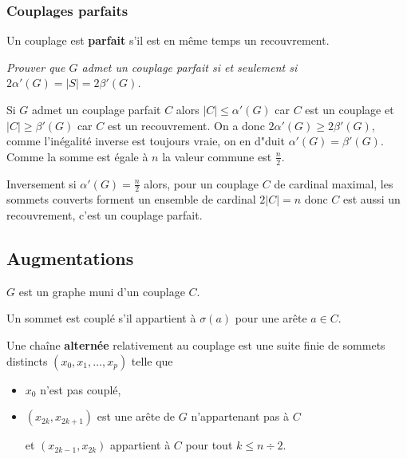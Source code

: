 \subsubsection{Couplages parfaits}
Un couplage est {\bf parfait} s'il est en même temps un recouvrement.
\begin{Exercise}[title=Un critère]\it 
Prouver que $G$ admet un couplage parfait si et seulement si $2\alpha'(G) = |S| = 2\beta'(G)$.
\end{Exercise}
\begin{Answer}

Si $G$ admet un couplage parfait $C$ alors $|C|\le \alpha'(G)$ car $C$ est un couplage et $|C|\ge \beta'(G)$ car $C$ est un recouvrement. On a donc $2\alpha'(G) \ge 2\beta'(G)$, comme l'inégalité inverse est toujours vraie, on en d"duit $\alpha'(G) = \beta'(G)$. Comme la somme est égale à $n$ la valeur commune est $\frac n2$.

Inversement si $\alpha'(G) = \frac n2$ alors, pour un couplage $C$ de cardinal maximal, les sommets couverts forment un ensemble de cardinal $2|C| = n$ donc $C$ est aussi un recouvrement, c'est un couplage parfait.
\end{Answer}
\subsection{Augmentations}
$G$ est un graphe muni d'un couplage $C$.

Un sommet est couplé s'il appartient à $\sigma(a)$ pour une arête $a\in C$.

Une chaîne {\bf alternée} relativement au couplage est une suite finie de sommets distincts $(x_0,x_1,\ldots,x_p)$ telle que 
\begin{itemize}
  \item $x_0$ n'est pas couplé,
  \item $(x_{2k},x_{2k+1})$ est une arête de $G$ n'appartenant pas à $C$ 
  
  et $(x_{2k-1},x_{2k})$ appartient à $C$ pour tout $k\le n\div 2$.
\end{itemize}

